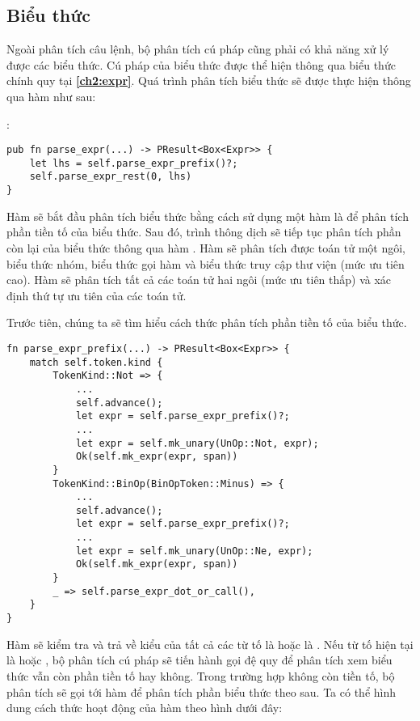 \subsection{Biểu thức}
    Ngoài phân tích câu lệnh, bộ phân tích cú pháp cũng phải có khả năng xử lý được các biểu thức. Cú pháp của biểu thức được thể hiện thông qua biểu thức chính quy tại \textbf{\ref{ch2:expr}}. Quá trình phân tích biểu thức sẽ được thực hiện thông qua hàm  như sau:

\noindent {}:
\begin{lstlisting}[]
pub fn parse_expr(...) -> PResult<Box<Expr>> {
    let lhs = self.parse_expr_prefix()?;
    self.parse_expr_rest(0, lhs)
}
\end{lstlisting}
    
Hàm  sẽ bắt đầu phân tích biểu thức bằng cách sử dụng một hàm là  để phân tích phần tiền tố của biểu thức. Sau đó, trình thông dịch sẽ tiếp tục phân tích phần còn lại của biểu thức thông qua hàm . Hàm  sẽ phân tích được toán tử một ngôi, biểu thức nhóm, biểu thức gọi hàm và biểu thức truy cập thư viện (mức ưu tiên cao). Hàm  sẽ phân tích tất cả các toán tử hai ngôi (mức ưu tiên thấp) và xác định thứ tự ưu tiên của các toán tử.

    Trước tiên, chúng ta sẽ tìm hiểu cách thức phân tích phần tiền tố của biểu thức.

\begin{lstlisting}[]
fn parse_expr_prefix(...) -> PResult<Box<Expr>> {
    match self.token.kind {
        TokenKind::Not => {
            ...
            self.advance();
            let expr = self.parse_expr_prefix()?;
            ...
            let expr = self.mk_unary(UnOp::Not, expr);
            Ok(self.mk_expr(expr, span))
        }
        TokenKind::BinOp(BinOpToken::Minus) => {
            ...
            self.advance();
            let expr = self.parse_expr_prefix()?;
            ...
            let expr = self.mk_unary(UnOp::Ne, expr);
            Ok(self.mk_expr(expr, span))
        }
        _ => self.parse_expr_dot_or_call(),
    }
}
\end{lstlisting}

Hàm  sẽ kiểm tra và trả về kiểu của tất cả các từ tố là  hoặc là . Nếu từ tố hiện tại là  hoặc , bộ phân tích cú pháp sẽ tiến hành gọi đệ quy để phân tích xem biểu thức vẫn còn phần tiền tố hay không. Trong trường hợp không còn tiền tố, bộ phân tích sẽ gọi tới hàm  để phân tích phần biểu thức theo sau. Ta có thể hình dung cách thức hoạt động của hàm  theo hình dưới đây:

